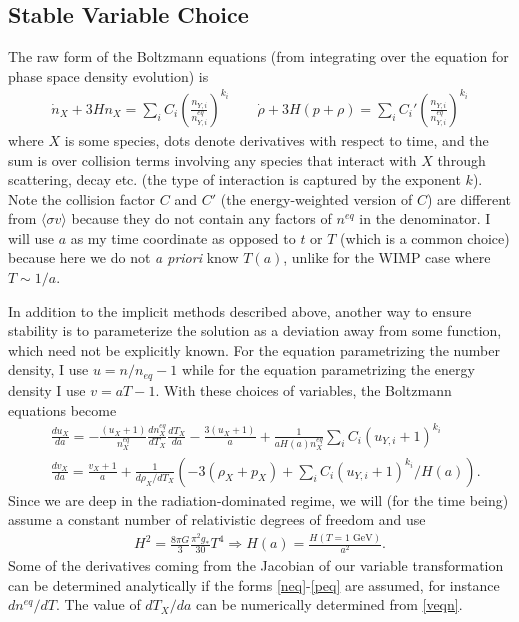 \documentclass[superscriptaddress,nofootinbib,notitlepage,onecolumn]{revtex4-1}
\newcommand{\beq}{\begin{eqnarray}}
\newcommand{\eeq}{\end{eqnarray}}
\begin{document}
\subsection{Stable Variable Choice}
The raw form of the Boltzmann equations (from integrating over the equation for phase space density evolution)  is \beq \dot{n}_X + 3 H n_X = \sum_i C_i \left(\frac{n_{Y, i}}{n^{eq}_{Y, i}}  \right)^{k_i} \quad \quad \dot{\rho} + 3 H (p + \rho) = \sum_i C_i' \left(\frac{n_{Y, i}}{n^{eq}_{Y, i}}  \right)^{k_i}\eeq
where $X$ is some species, dots denote derivatives with respect to time, and the sum is over collision terms involving any species that interact with $X$ through scattering, decay etc. (the type of interaction is captured by the exponent $k$). Note the collision factor $C$ and $C'$ (the energy-weighted version of $C$) are different from $\langle\sigma v\rangle$ because they do not contain any factors of $n^{eq}$ in the denominator. I will use $a$ as my time coordinate as opposed to $t$ or $T$ (which is a common choice) because here we do not \emph{a priori} know $T(a)$, unlike for the WIMP case where $T \sim 1/a$. 

In addition to the implicit methods described above, another way to ensure stability is to parameterize the solution as a deviation away from some function, which need not be explicitly known. For the equation parametrizing the number density, I use $ u  = n / n_{eq} - 1$ while for the equation parametrizing the energy density I use $ v= a T - 1$. With these choices of variables, the Boltzmann equations become 
\begin{align}
&\frac{d u_X }{d a} = -\frac{(u_X+1)}{n^{eq}_X} \frac{d n^{eq}_X}{d T_X}\frac{dT_X }{d a} - \frac{3 (u_X + 1)}{a} + \frac{1}{a H(a) n^{eq}_X} \sum_i C_i (u_{Y, i} + 1)^{k_i}\label{ueqn}\\
&\frac{d v_X }{d a} =\frac{v_X+1}{a} + \frac{1}{d \rho_X /d T_X} \left( -3 (\rho_X + p_X) + \sum_i C_i (u_{Y, i} + 1)^{k_i} / H(a)\right). \label{veqn}
\end{align}
Since we are deep in the radiation-dominated regime, we will (for the time being) assume a constant number of relativistic degrees of freedom and use \beq H^2 = \frac{8 \pi G}{3}\frac{\pi^2 g_*}{30} T^4 \Rightarrow H(a) = \frac{H(T = \text{1 GeV})}{ a^2}.\eeq 
Some of the derivatives coming from the Jacobian of our variable transformation can be determined analytically if the forms \eqref{neq}-\eqref{peq} are assumed, for instance $d n^{eq}/d T$. The value of $d T_X/d a$ can be numerically determined from \eqref{veqn}.
\end{document}
